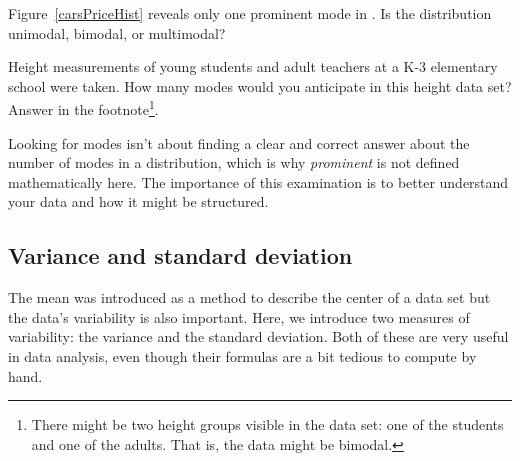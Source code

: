 \begin{exercise}
Figure~\ref{carsPriceHist} reveals only one prominent mode in . Is the distribution unimodal, bimodal, or multimodal?
\end{exercise}

\begin{exercise}
Height measurements of young students and adult teachers at a K-3 elementary school were taken. How many modes would you anticipate in this height data set? Answer in the footnote\footnote{There might be two height groups visible in the data set: one of the students and one of the adults. That is, the data might be bimodal.}.
\end{exercise}

\begin{tipBox}{
Looking for modes isn't about finding a clear and correct answer about the number of modes in a distribution, which is why \emph{prominent} is not defined mathematically here. The importance of this examination is to better understand your data and how it might be structured.}
\end{tipBox}


\subsection{Variance and standard deviation}
\label{variability}

The mean was introduced as a method to describe the center of a data set but the data's variability is also important. Here, we introduce two measures of variability: the variance and the standard deviation. Both of these are very useful in data analysis, even though their formulas are a bit tedious to compute by hand.

